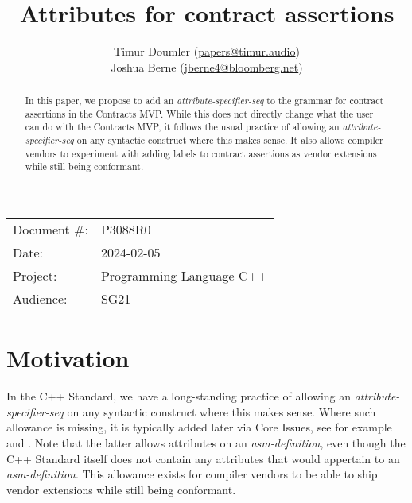 

 \usepackage[bottom]{footmisc} 


\title{Attributes for contract assertions}
\author{ Timur Doumler \small(\href{mailto:papers@timur.audio}{papers@timur.audio})  \\
Joshua Berne \small(\href{mailto:jberne4@bloomberg.net}{jberne4@bloomberg.net})
}
\date{}
\maketitle

\begin{tabular}{ll}
Document \#: & P3088R0 \\
Date: &2024-02-05 \\
Project: & Programming Language C++ \\
Audience: & SG21
\end{tabular}

\begin{abstract}
In this paper, we propose to add an \emph{attribute-specifier-seq} to the grammar for contract assertions in the Contracts MVP. While this does not directly change what the user can do with the Contracts MVP, it follows the usual practice of allowing an \emph{attribute-specifier-seq} on any syntactic construct where this makes sense. It also allows compiler vendors to experiment with adding labels to contract assertions as vendor extensions while still being conformant. 
\end{abstract}

\section{Motivation}
\label{sec:intro}

In the C++ Standard, we have a long-standing practice of allowing an \emph{attribute-specifier-seq} on any syntactic construct where this makes sense. Where such allowance is missing, it is typically added later via Core Issues, see for example \cite{CWG1657} and \cite{CWG2262}. Note that the latter allows attributes on an \emph{asm-definition}, even though the C++ Standard itself does not contain any attributes that would appertain to an \emph{asm-definition}. This allowance exists for compiler vendors to be able to ship vendor extensions while still being conformant.

